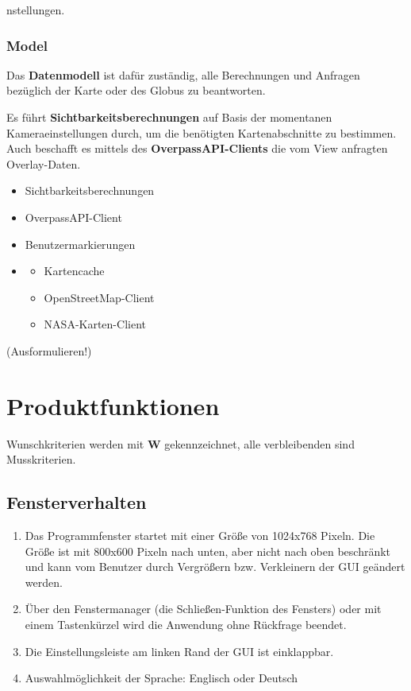 \documentclass[10pt]{scrreprt}
\begin{document}
nstellungen.



\subsection*{Model}
Das \textbf{Datenmodell} ist dafür zuständig, alle Berechnungen und Anfragen bezüglich der Karte oder des Globus zu beantworten.

Es führt \textbf{Sichtbarkeitsberechnungen} auf Basis der momentanen Kameraeinstellungen durch, um die benötigten Kartenabschnitte zu bestimmen.
Auch beschafft es mittels des \textbf{OverpassAPI-Clients} die vom View anfragten Overlay-Daten.

\begin{itemize}
\item Sichtbarkeitsberechnungen
\item OverpassAPI-Client
\item Benutzermarkierungen
\item \begin{itemize}
\item Kartencache
\item OpenStreetMap-Client
\item NASA-Karten-Client
\end{itemize}
\end{itemize}
\vspace{1cm}(Ausformulieren!)


\chapter{Produktfunktionen}

\newcommand{\muss}{\renewcommand{\labelenumi}{\textbf{/F\numprint{\theenumi}0/}}}
\newcommand{\wunsch}{\renewcommand{\labelenumi}{\textbf{/F\numprint{\theenumi}0W/}}}
\muss


\newcommand{\W}{\textbf{W }}
Wunschkriterien werden mit \W  gekennzeichnet, alle verbleibenden sind Musskriterien.

\section{Fensterverhalten}
\begin{enumerate}[leftmargin=2.5cm]
\item Das Programmfenster startet mit einer Größe von 1024x768 Pixeln. Die Größe ist mit 800x600 Pixeln nach unten, aber nicht nach oben beschränkt und kann vom Benutzer durch Vergrößern bzw. Verkleinern der GUI geändert werden.
\item Über den Fenstermanager (die Schließen-Funktion des Fensters) oder mit einem Tastenkürzel wird die Anwendung ohne Rückfrage beendet.
\item Die Einstellungsleiste am linken Rand der GUI ist einklappbar.
\item Auswahlmöglichkeit der Sprache: Englisch oder Deutsch
\end{enumerate}
\end{document}
